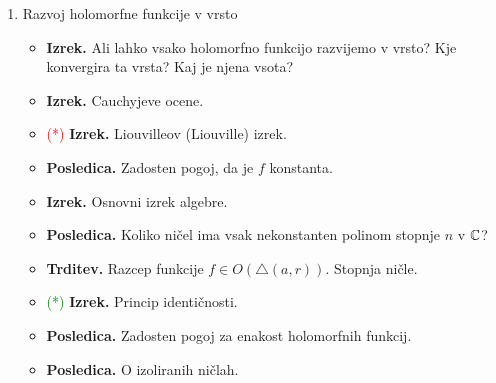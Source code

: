 \begin{enumerate}
    \item Razvoj holomorfne funkcije v vrsto
    \begin{itemize}
        \item \textbf{Izrek.} Ali lahko vsako holomorfno funkcijo razvijemo v vrsto? Kje konvergira ta vrsta? Kaj je njena vsota?
        \item \textbf{Izrek.} Cauchyjeve ocene.
        \item \textcolor{red}{(*)} \textbf{Izrek.} Liouvilleov (Liouville) izrek.
        \item \textbf{Posledica.} Zadosten pogoj, da je \(f\) konstanta.
        \item \textbf{Izrek.} Osnovni izrek algebre.
        \item \textbf{Posledica.} Koliko ničel ima vsak nekonstanten polinom stopnje \(n\) v \(\mathbb{C}\)?
        \item \textbf{Trditev.} Razcep funkcije \(f \in O(\triangle (a, r))\). Stopnja ničle.
        \item \textcolor{green}{(*)} \textbf{Izrek.} Princip identičnosti.
        \item \textbf{Posledica.} Zadosten pogoj za enakost holomorfnih funkcij.
        \item \textbf{Posledica.} O izoliranih ničlah.
    \end{itemize}


\end{enumerate}
